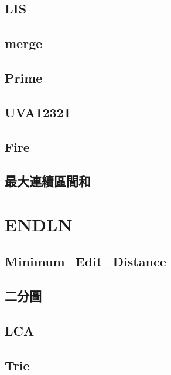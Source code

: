     \subsection{LIS}
        
    \subsection{merge}
          
    \subsection{Prime}
        
    \subsection{UVA12321}
        
    \subsection{Fire}
        
    \subsection{最大連續區間和}
        

\section{ENDLN}
    \subsection{Minimum_Edit_Distance}
        
    \subsection{二分圖}
        
    \subsection{LCA}
        
    \subsection{Trie}
        
